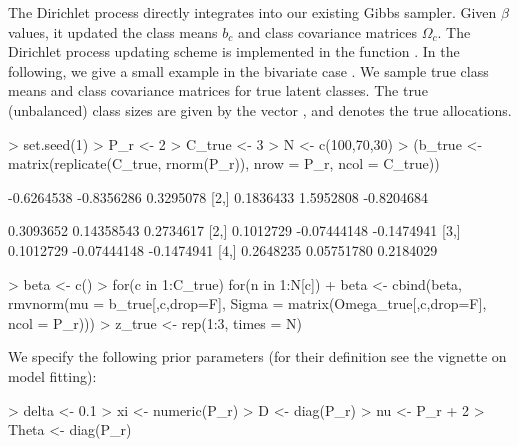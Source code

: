 \documentclass[article]{jss}
\newcommand{\fct}[1]{\code{#1()}}
\begin{document}
The Dirichlet process directly integrates into our existing Gibbs sampler. Given $\beta$ values, it updated the class means $b_c$ and class covariance matrices $\Omega_c$. The Dirichlet process updating scheme is implemented in the function \fct{update\_classes\_dp}. In the following, we give a small example in the bivariate case . We sample true class means  and class covariance matrices  for  true latent classes. The true (unbalanced) class sizes are given by the vector , and  denotes the true allocations.

\begin{Schunk}
\begin{Sinput}
> set.seed(1)
> P_r <- 2
> C_true <- 3
> N <- c(100,70,30)
> (b_true <- matrix(replicate(C_true, rnorm(P_r)), nrow = P_r, ncol = C_true))
\end{Sinput}
\begin{Soutput}
           [,1]       [,2]       [,3]
[1,] -0.6264538 -0.8356286  0.3295078
[2,]  0.1836433  1.5952808 -0.8204684
\end{Soutput}
\begin{Soutput}
          [,1]        [,2]       [,3]
[1,] 0.3093652  0.14358543  0.2734617
[2,] 0.1012729 -0.07444148 -0.1474941
[3,] 0.1012729 -0.07444148 -0.1474941
[4,] 0.2648235  0.05751780  0.2184029
\end{Soutput}
\begin{Sinput}
> beta <- c()
> for(c in 1:C_true) for(n in 1:N[c])
+    beta <- cbind(beta, rmvnorm(mu = b_true[,c,drop=F], Sigma = matrix(Omega_true[,c,drop=F], ncol = P_r)))
> z_true <- rep(1:3, times = N)
\end{Sinput}
\end{Schunk}

We specify the following prior parameters (for their definition see the vignette on model fitting):

\begin{Schunk}
\begin{Sinput}
> delta <- 0.1
> xi <- numeric(P_r)
> D <- diag(P_r)
> nu <- P_r + 2
> Theta <- diag(P_r)
\end{Sinput}
\end{Schunk}
\end{document}
